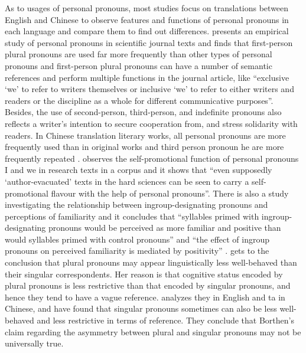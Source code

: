 \documentclass[degree=bachelor,language=english]{thuthesis}
\begin{document}
As to usages of personal pronouns, most studies focus on translations between English and Chinese to observe features and functions of personal pronouns in each language and compare them to find out differences.
\citet{kuo1999use} presents an empirical study of personal pronouns in scientific journal texts and finds that first-person plural pronouns are used far more frequently than other types of personal pronouns and first-person plural pronouns can have a number of semantic references and perform multiple functions in the journal article, like “exclusive ‘we’ to refer to writers themselves or inclusive ‘we’ to refer to either writers and readers or the discipline as a whole for different communicative purposes”. Besides, the use of second-person, third-person, and indefinite pronouns also reflects a writer’s intention to secure cooperation from, and stress solidarity with readers. In Chinese translation literary works, all personal pronouns are more frequently used than in original works and third person pronoun he are more frequently repeated %
\citep{wang2010hanyu}.
\citet{harwood2005nowhere} observes the self-promotional function of personal pronouns I and we in research texts in a corpus and it shows that “even supposedly ‘author-evacuated’ texts in the hard sciences can be seen to carry a self-promotional flavour with the help of personal pronouns”. There is also a study investigating the relationship between ingroup-designating pronouns and perceptions of familiarity and it concludes that “syllables primed with ingroup-designating pronouns would be perceived as more familiar and positive than would syllables primed with control pronouns” and “the effect of ingroup pronouns on perceived familiarity is mediated by positivity” %
\citep{housley2010we}.
\citet{borthen2010we} gets to the conclusion that plural pronouns may appear linguistically less well-behaved than their singular correspondents. Her reason is that cognitive status encoded by plural pronouns is less restrictive than that encoded by singular pronouns, and hence they tend to have a vague reference.
\citet{chen2011less} analyzes they in English and ta in Chinese, and have found that singular pronouns sometimes can also be less well-behaved and less restrictive in terms of reference. They conclude that Borthen’s claim regarding the asymmetry between plural and singular pronouns may not be universally true.
\end{document}
